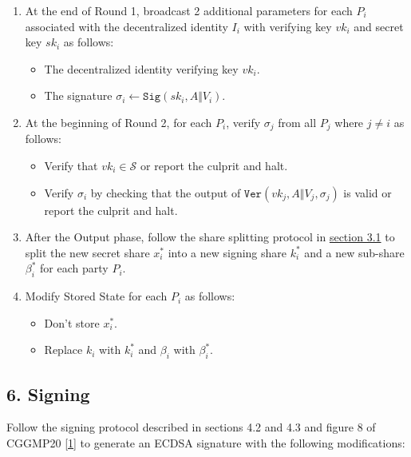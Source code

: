 \documentclass[
]{article}
\providecommand{\tightlist}{%
  \setlength{\itemsep}{0pt}\setlength{\parskip}{0pt}}
\begin{document}
\begin{enumerate}
\def\labelenumi{\arabic{enumi}.}
\tightlist
\item
  At the end of Round 1, broadcast 2 additional parameters for each
  \(P_i\) associated with the decentralized identity \(I_i\) with
  verifying key \(vk_i\) and secret key \(sk_i\) as follows:

  \begin{itemize}
  \tightlist
  \item
    The decentralized identity verifying key \(vk_i\).
  \item
    The signature
    \(\sigma _i \leftarrow \mathtt{Sig}(sk_i, A \Vert V_i)\).
  \end{itemize}
\item
  At the beginning of Round 2, for each \(P_i\), verify \(\sigma _j\)
  from all \(P_j\) where \(j \neq i\) as follows:

  \begin{itemize}
  \tightlist
  \item
    Verify that \(vk_i \in \mathcal{S}\) or report the culprit and halt.
  \item
    Verify \(\sigma _i\) by checking that the output of
    \(\mathtt{Ver}(vk_j, A \Vert V_j, \sigma _j)\) is valid or report
    the culprit and halt.
  \end{itemize}
\item
  After the Output phase, follow the share splitting protocol in
  \protect\hyperlink{share-splitting}{section 3.1} to split the new
  secret share \(x_i^\ast\) into a new signing share \(k_i^\ast\) and a
  new sub-share \(\beta _i^\ast\) for each party \(P_i\).
\item
  Modify Stored State for each \(P_i\) as follows:

  \begin{itemize}
  \tightlist
  \item
    Don't store \(x_i^\ast\).
  \item
    Replace \(k_i\) with \(k_i^\ast\) and \(\beta _i\) with
    \(\beta _i^\ast\).
  \end{itemize}
\end{enumerate}

\hypertarget{signing}{%
\subsection{6. Signing}\label{signing}}

Follow the signing protocol described in sections 4.2 and 4.3 and figure
8 of CGGMP20 {[}\protect\hyperlink{ref-cggmp20}{1}{]} to generate an
ECDSA signature with the following modifications:
\end{document}
